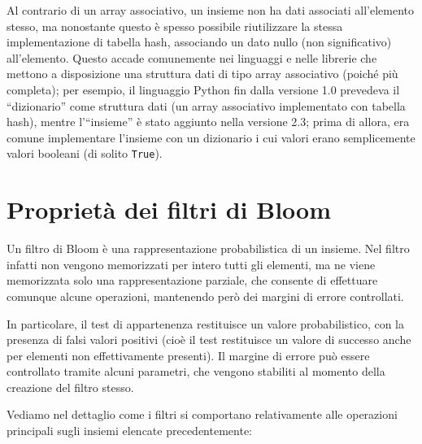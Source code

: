 Al contrario di un array associativo, un insieme non ha dati associati all'elemento stesso, ma
nonostante questo è spesso possibile riutilizzare la stessa implementazione di tabella hash,
associando un dato nullo (non significativo) all'elemento. Questo accade comunemente nei linguaggi e
nelle librerie che mettono a disposizione una struttura dati di tipo array associativo (poiché più
completa); per esempio, il linguaggio Python fin dalla versione 1.0 prevedeva il ``dizionario'' come
struttura dati (un array associativo implementato con tabella hash), mentre l'``insieme'' è stato
aggiunto nella versione 2.3; prima di allora, era comune implementare l'insieme con un dizionario i
cui valori erano semplicemente valori booleani (di solito \verb|True|).

\section{Propriet\`a dei filtri di Bloom}

Un filtro di Bloom \cite{bloomfilters} è una rappresentazione probabilistica di un insieme. Nel
filtro infatti non vengono memorizzati per intero tutti gli elementi, ma ne viene memorizzata solo
una rappresentazione parziale, che consente di effettuare comunque alcune operazioni, mantenendo
però dei margini di errore controllati.

In particolare, il test di appartenenza restituisce un valore probabilistico, con la presenza di
falsi valori positivi (cioè il test restituisce un valore di successo anche per elementi non
effettivamente presenti). Il margine di errore può essere controllato tramite alcuni parametri, che
vengono stabiliti al momento della creazione del filtro stesso.

Vediamo nel dettaglio come i filtri si comportano relativamente alle operazioni principali sugli
insiemi elencate precedentemente:

